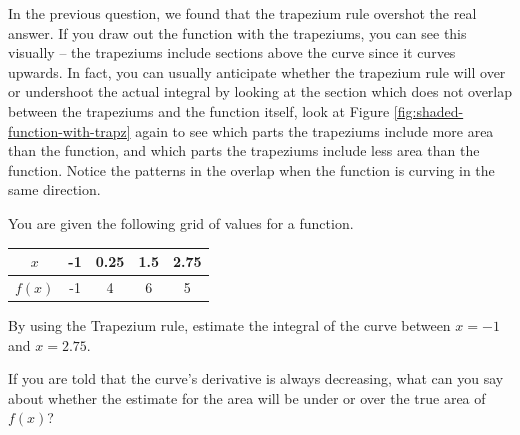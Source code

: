 In the previous question, we found that the trapezium rule overshot the real answer. If you draw out the function with the trapeziums, you can see this visually -- the trapeziums include sections above the curve since it curves upwards. 
In fact, you can usually anticipate whether the trapezium rule will over or undershoot the actual integral 
by looking at the section which does not overlap between the trapeziums and the function itself, look at Figure \ref{fig:shaded-function-with-trapz} again to see which parts the trapeziums include more area than the function, and which parts the trapeziums include less area than the function. Notice the patterns in the overlap when the function is curving in the same direction.

\begin{example}
    You are given the following grid of values for a function.

        \begin{center}
    \begin{tabular}{c|cccc}
    $x$        & -1 & 0.25 & 1.5 & 2.75 \\
    \hline
    $f(x)$ & -1 & 4 & 6 & 5
    \end{tabular}
    \end{center}

    By using the Trapezium rule, estimate the integral of the curve between $x=-1$ and $x=2.75$.

    If you are told that the curve's derivative is always decreasing, what can you say about whether the estimate for the area will be under or over the true area of $f(x)$?
\end{example}
